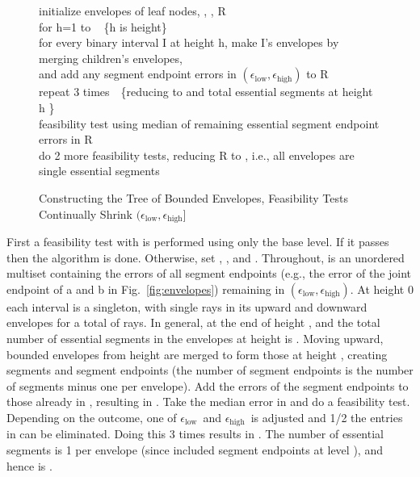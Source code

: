 \documentclass[11pt]{article}
\newlength{\Ainlength}
\newlength{\Ainindent}
\newlength{\Aintemp}
\newcommand{\Ain}[1]{\setlength{\Aintemp}{\Ainindent}\addtolength{\Aintemp}{#1\Ainlength} \hspace*{\Aintemp}}
\newcommand{\epslow}{\ensuremath{\epsilon_\mathrm{low}}}
\newcommand{\epshigh}{\ensuremath{\epsilon_\mathrm{high}}}
\newcommand{\epsinterval}[1]{\ensuremath{(\epslow,\epshigh#1}}
\begin{document}
\begin{figure}
\setlength{\Ainindent}{0.4in}

\noindent
\textsf{\small
\hspace*{-0.08in}
\Ain{0} initialize envelopes of leaf nodes, , , R \\
\Ain{0} for h=1 to ~ \{h is height\}\\
\Ain{1}    for every binary interval I at height h, make I's envelopes by merging children's envelopes,\\
\Ain{2} and add any segment endpoint errors in \epsinterval{)} to R\\
\Ain{1} repeat 3 times~~\{reducing  to  and total essential segments at height h \}\\
\Ain{2}    feasibility test using median of remaining essential segment endpoint errors in R\\
\Ain{0} do 2 more feasibility tests, reducing R to , i.e., all envelopes are single essential segments
}

\caption{Constructing the Tree of Bounded Envelopes, Feasibility Tests Continually Shrink \epsinterval{]}} \label{fig:constructingtree}
\vspace*{-0.08in}
\hrulefill
\vspace*{-0.1in}
\end{figure}


First a feasibility test with  is performed using only the base level.
If it passes then the algorithm is done.
Otherwise, set , , and .
Throughout,  is an unordered multiset containing the errors of all segment endpoints (e.g., the error of the joint endpoint of \textsf{a} and \textsf{b} in Fig.~\ref{fig:envelopes}) remaining in \epsinterval{)}.
At height 0 each interval is a singleton, with single rays in its upward and downward envelopes for a total of  rays.
In general, at the end of height ,  and the total number of essential segments in the envelopes at height  is .
Moving upward, bounded envelopes from height  are merged to form those at height , creating
 segments and  segment endpoints (the number of segment endpoints is the number of segments minus one per envelope).
Add the errors of the segment endpoints to those already in , resulting in .
Take the median error in  and do a feasibility test.
Depending on the outcome, one of \epslow\ and \epshigh\ is adjusted and 1/2 the entries in  can be eliminated.
Doing this 3 times results in .
The number of essential segments is  1 per envelope (since  included segment endpoints at level ), and hence is .
\end{document}
